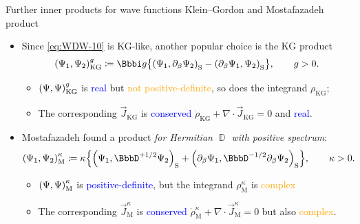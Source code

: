 \documentclass[8pt]{beamer}
\begin{document}
\begin{frame}%
{Further inner products for wave functions}%
{Klein--Gordon and Mostafazadeh product}
\begin{itemize}
\item Since \cref{eq:WDW-10} is KG-like, another popular choice is the KG 
product
\begin{align}
\rbr{\Psi_1,\Psi_2}_\text{KG}^g \coloneqq \ii g \cbr{
\rbr{\Psi_1,\partial_\beta\Psi_2}_\text{S} -
\rbr{\partial_\beta\Psi_1,\Psi_2}_\text{S}},\qquad g > 0.
\end{align}
\begin{itemize}
\item ${\left(\Psi,\Psi\right)}_\text{KG}^g$ is \textcolor{blue}{real} but
\textcolor{orange}{not positive-definite}, so does the integrand
$\rho_\text{KG}$;
\item The corresponding $\vec{J}_\text{KG}$ is
\textcolor{blue}{conserved} $\dot{\rho}_\text{KG} +
\nabla\cdot \vec{J}_\text{KG} = 0$ and \textcolor{blue}{real}.
\end{itemize}

\item Mostafazadeh found
a product \emph{for Hermitian $\BbbD$ with positive spectrum}:
\begin{align}
\rbr{\Psi_1,\Psi_2}_\text{M}^{\kappa} &\coloneqq\kappa\cbr{
\rbr{\Psi_1,\BbbD^{+1/2}\Psi_2}_\text{S}
+\rbr{\partial_\beta\Psi_1,
\BbbD^{-1/2}\partial_\beta\Psi_2}_\text{S}}, \qquad \kappa > 0.
\end{align}
\begin{itemize}
\item ${\left(\Psi,\Psi\right)}_\text{M}^{\kappa}$ is
\textcolor{blue}{positive-definite}, but the integrand $\rho_\text{M}^\kappa$
is \textcolor{orange}{complex}
\item The corresponding $\vec{J}_\text{M}^\kappa$ is
\textcolor{blue}{conserved} $\dot{\rho}_\text{M}^\kappa + 
\nabla\cdot \vec{J}_\text{M}^\kappa = 0$ but also \textcolor{orange}{complex}.
\end{itemize}
\end{itemize}
\end{frame}
\end{document}
